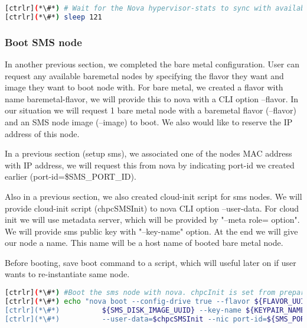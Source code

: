 
\begin{lstlisting}[language=bash,keywords={}]
[ctrlr](*\#*) # Wait for the Nova hypervisor-stats to sync with available Ironic resources
[ctrlr](*\#*) sleep 121
\end{lstlisting} 

\subsubsection{Boot SMS node}

	In another previous section, we completed the bare metal configuration. User can request any available baremetal nodes by specifying the flavor they want and image they want to boot node with. For bare metal, we created a flavor with name baremetal-flavor, we will provide this to nova with a CLI option --flavor. In our situation we will request 1 bare metal node with a baremetal flavor (--flavor) and an SMS node image (--image) to boot.  We also would like to reserve the IP address of this node. 

	In a previous section (setup sms), we associated one of the nodes MAC address with IP address, we will request this from nova by indicating port-id we created earlier (port-id=\${SMS\_PORT\_ID}). 

	Also in a previous section, we also created cloud-init script for sms nodes. We will provide cloud-init script (chpcSMSInit) to nova CLI option --user-data. For cloud init we will use metadata server, which will be provided by "--meta role= option". We will provide sms public key with "--key-name" option. At the end we will give our node a name. This name will be a host name of booted bare metal node.

	Before booting, save boot command to a script, which will useful later on if user wants to re-instantiate same node.


\begin{lstlisting}[language=bash,keywords={}]
[ctrlr](*\#*) #Boot the sms node with nova. chpcInit is set from prepare_cloudInit
[ctrlr](*\#*) echo "nova boot --config-drive true --flavor ${FLAVOR_UUID} --image \
[ctrlr](*\#*)          ${SMS_DISK_IMAGE_UUID} --key-name ${KEYPAIR_NAME} --meta role=webservers \
[ctrlr](*\#*)          --user-data=$chpcSMSInit --nic port-id=${SMS_PORT_ID} ${sms_name}" > boot_sms
\end{lstlisting} 

